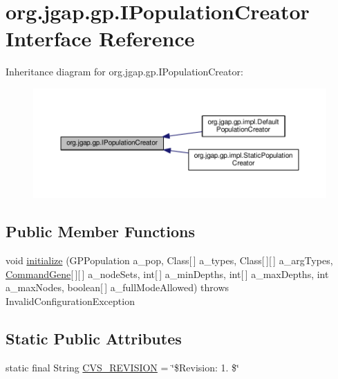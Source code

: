 \hypertarget{interfaceorg_1_1jgap_1_1gp_1_1_i_population_creator}{\section{org.\-jgap.\-gp.\-I\-Population\-Creator Interface Reference}
\label{interfaceorg_1_1jgap_1_1gp_1_1_i_population_creator}
}


Inheritance diagram for org.\-jgap.\-gp.\-I\-Population\-Creator\-:
\nopagebreak
\begin{figure}[H]
\begin{center}
\leavevmode
\includegraphics[width=350pt]{interfaceorg_1_1jgap_1_1gp_1_1_i_population_creator__inherit__graph}
\end{center}
\end{figure}
\subsection*{Public Member Functions}
\begin{DoxyCompactItemize}
\item 
void \hyperlink{interfaceorg_1_1jgap_1_1gp_1_1_i_population_creator_aafb1ee0ede9ce0a2d52f7e42de9f14e0}{initialize} (G\-P\-Population a\-\_\-pop, Class\mbox{[}$\,$\mbox{]} a\-\_\-types, Class\mbox{[}$\,$\mbox{]}\mbox{[}$\,$\mbox{]} a\-\_\-arg\-Types, \hyperlink{classorg_1_1jgap_1_1gp_1_1_command_gene}{Command\-Gene}\mbox{[}$\,$\mbox{]}\mbox{[}$\,$\mbox{]} a\-\_\-node\-Sets, int\mbox{[}$\,$\mbox{]} a\-\_\-min\-Depths, int\mbox{[}$\,$\mbox{]} a\-\_\-max\-Depths, int a\-\_\-max\-Nodes, boolean\mbox{[}$\,$\mbox{]} a\-\_\-full\-Mode\-Allowed)  throws Invalid\-Configuration\-Exception
\end{DoxyCompactItemize}
\subsection*{Static Public Attributes}
\begin{DoxyCompactItemize}
\item 
static final String \hyperlink{interfaceorg_1_1jgap_1_1gp_1_1_i_population_creator_a3ff33233616d230c6f091ad9331b90c3}{C\-V\-S\-\_\-\-R\-E\-V\-I\-S\-I\-O\-N} = \char`\"{}\$Revision\-: 1. \$\char`\"{}
\end{DoxyCompactItemize}


